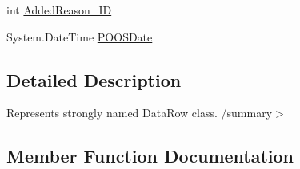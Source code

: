 \begin{DoxyCompactItemize}
\item 
int \hyperlink{class_env_int_1_1_win32_1_1_field_tech_1_1_manager_1_1_data_sets_1_1_guide_ware_mobile_data_set_1_1_component_row_a0231ffde14cf327ee9bece5a46d1a911}{Added\+Reason\+\_\+\+I\+D}
\item 
System.\+Date\+Time \hyperlink{class_env_int_1_1_win32_1_1_field_tech_1_1_manager_1_1_data_sets_1_1_guide_ware_mobile_data_set_1_1_component_row_a2f098180912ce436b28799670b9ed354}{P\+O\+O\+S\+Date}
\end{DoxyCompactItemize}


\subsection{Detailed Description}
Represents strongly named Data\+Row class. /summary$>$ 

\subsection{Member Function Documentation}
\hypertarget{class_env_int_1_1_win32_1_1_field_tech_1_1_manager_1_1_data_sets_1_1_guide_ware_mobile_data_set_1_1_component_row_a03e703b46c58437de6b8a02bc05d2e85}{}
